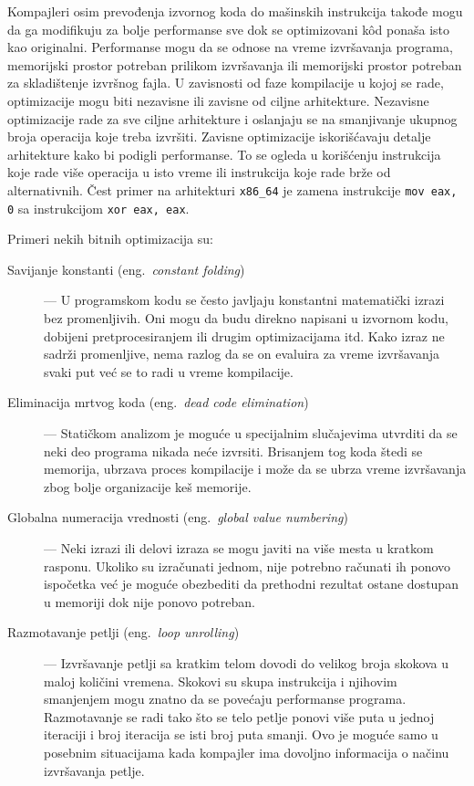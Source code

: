 \documentclass[12pt,oneside]{memoir}
\begin{document}
Kompajleri osim prevođenja izvornog koda do mašinskih instrukcija takođe mogu da ga modifikuju za bolje performanse sve dok se optimizovani k\^od ponaša isto kao originalni.
Performanse mogu da se odnose na vreme izvršavanja programa, memorijski prostor potreban prilikom izvršavanja ili memorijski prostor potreban za skladištenje izvršnog fajla.
U zavisnosti od faze kompilacije u kojoj se rade, optimizacije mogu biti nezavisne ili zavisne od ciljne arhitekture. %
Nezavisne optimizacije rade za sve ciljne arhitekture i oslanjaju se na smanjivanje ukupnog broja operacija koje treba izvršiti.
Zavisne optimizacije iskorišćavaju detalje arhitekture kako bi podigli performanse.
To se ogleda u korišćenju instrukcija koje rade više operacija u isto vreme ili instrukcija koje rade brže od alternativnih.
Čest primer na arhitekturi \verb|x86_64| je zamena instrukcije \verb|mov eax, 0| sa instrukcijom \verb|xor eax, eax|.

Primeri nekih bitnih optimizacija su:
\begin{description}
  \item[Savijanje konstanti (eng.~{\em constant folding})] --- U programskom kodu se često javljaju konstantni matematički izrazi bez promenljivih. Oni mogu da budu direkno napisani u izvornom kodu, dobijeni pretprocesiranjem ili drugim optimizacijama itd. Kako izraz ne sadrži promenljive, nema razlog da se on evaluira za vreme izvršavanja svaki put već se to radi u vreme kompilacije.
  \item[Eliminacija mrtvog koda (eng.~{\em dead code elimination})] --- Statičkom analizom je moguće u specijalnim slučajevima utvrditi da se neki deo programa nikada neće izvrsiti. Brisanjem tog koda štedi se memorija, ubrzava proces kompilacije i može da se ubrza vreme izvršavanja zbog bolje organizacije keš memorije.
  \item[Globalna numeracija vrednosti (eng.~{\em global value numbering})] --- Neki izrazi ili delovi izraza se mogu javiti na više mesta u kratkom rasponu. Ukoliko su izračunati jednom, nije potrebno računati ih ponovo ispočetka već je moguće obezbediti da prethodni rezultat ostane dostupan u memoriji dok nije ponovo potreban.
  \item[Razmotavanje petlji (eng.~{\em loop unrolling})] --- Izvršavanje petlji sa kratkim telom dovodi do velikog broja skokova u maloj količini vremena. Skokovi su skupa instrukcija i njihovim smanjenjem mogu znatno da se povećaju performanse programa. Razmotavanje se radi tako što se telo petlje ponovi više puta u jednoj iteraciji i broj iteracija se isti broj puta smanji. Ovo je moguće samo u posebnim situacijama kada kompajler ima dovoljno informacija o načinu izvršavanja petlje.
\end{description}
\end{document}
